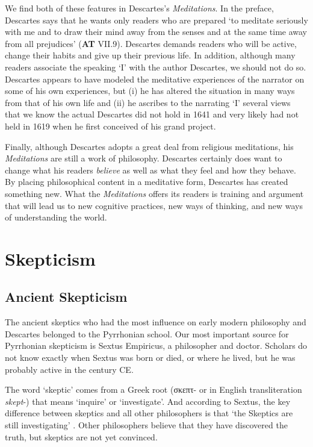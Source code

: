 We find both of these features in Descartes's \textit{Meditations}. In the preface, Descartes says that he wants only readers who are prepared `to meditate seriously with me and to draw their mind away from the senses and at the same time away from all prejudices' (\textbf{AT} VII.9). Descartes demands readers who will be active, change their habits and give up their previous life. In addition, although many readers associate the speaking `I' with the author Descartes, we should not do so. Descartes appears to have modeled the meditative experiences of the narrator on some of his own experiences, but (i) he has altered the situation in many ways from that of his own life and (ii) he ascribes to the narrating `I' several views that we know the actual Descartes did not hold in 1641 and very likely had not held in 1619 when he first conceived of his grand project.

Finally, although Descartes adopts a great deal from religious meditations, his \textit{Meditations} are still a work of philosophy. Descartes certainly does want to change what his readers \textit{believe} as well as what they feel and how they behave. By placing philosophical content in a meditative form, Descartes has created something new. What the \textit{Meditations} offers its readers is training and argument that will lead us to new cognitive practices, new ways of thinking, and new ways of understanding the world.

\section*{Skepticism}

\subsection*{Ancient Skepticism}

The ancient skeptics who had the most influence on early modern philosophy and Descartes belonged to the Pyrrhonian school. Our most important source for Pyrrhonian skepticism is Sextus Empiricus, a philosopher and doctor. Scholars do not know exactly when Sextus was born or died, or where he lived, but he was probably active in the  century CE.

The word `skeptic' comes from a Greek root (\textgreek{σκεπτ}- or in English transliteration \textit{skept}-) that means `inquire' or `investigate'. And according to Sextus, the key difference between skeptics and all other philosophers is that `the Skeptics are still investigating' \citep[I i 3]{annasbarnes1994}. Other philosophers believe that they have discovered the truth, but skeptics are not yet convinced.

